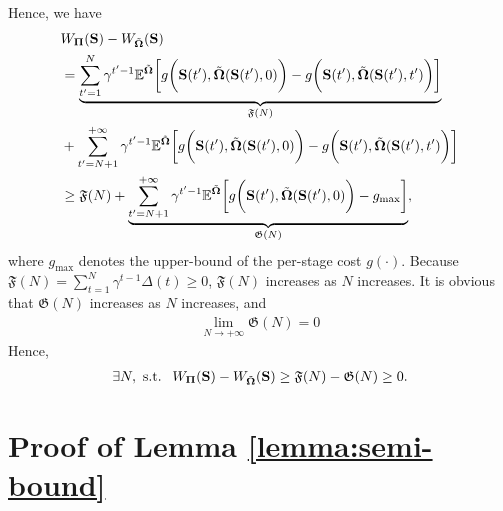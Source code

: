 Hence, we have
{\small
\begin{align*}
&W_{\boldsymbol{\Pi}}(\mathbf{S})- W_{\tilde{\boldsymbol{\Omega}}}(\mathbf{S})\\
&= 
\underbrace{\sum_{t'=1}^{N} \gamma^{t'-1} \mathbb{E}^{ \tilde{\boldsymbol{\Omega}} } \bigg[
	g\bigg(\mathbf{S}(t'), \tilde{\boldsymbol{\Omega}}(\mathbf{S}(t'),0)\bigg)
	- 	g\bigg(\mathbf{S}(t'), \tilde{\boldsymbol{\Omega}}(\mathbf{S}(t'),t')\bigg)
\bigg]}_{\mathfrak{F}(N)}\\
&+\sum_{t'=N+1}^{+\infty} \gamma^{t'-1} \mathbb{E}^{ \tilde{\boldsymbol{\Omega}} } \bigg[
	g\bigg(\mathbf{S}(t'), \tilde{\boldsymbol{\Omega}}(\mathbf{S}(t'),0)\bigg)
	- 	g\bigg(\mathbf{S}(t'), \tilde{\boldsymbol{\Omega}}(\mathbf{S}(t'),t')\bigg)
\bigg]\\
&\geq \mathfrak{F}(N) + \underbrace{\sum_{t'=N+1}^{+\infty} \gamma^{t'-1} \mathbb{E}^{ \tilde{\boldsymbol{\Omega}} } \bigg[
	g\bigg(\mathbf{S}(t'), \tilde{\boldsymbol{\Omega}}(\mathbf{S}(t'),0)\bigg)
	- 	g_{\max}
\bigg]}_{\mathfrak{G}(N)},
\end{align*}
}%
where $g_{\max}$ denotes the upper-bound of the per-stage cost $g(\cdot)$.
Because  $\mathfrak{F}(N)=\sum_{t=1}^{N}\gamma^{t-1}\Delta(t)\geq 0$, $\mathfrak{F}(N)$ increases as $N$ increases.
It is obvious that $\mathfrak{G}(N)$ increases as $N$ increases, and 
\begin{align*}
\lim\limits_{N\to+\infty}\mathfrak{G}(N)=0
\end{align*}
Hence, 
\begin{align*}
\exists N,\ \mbox{s.t. }\ W_{\boldsymbol{\Pi}}(\mathbf{S})- W_{\tilde{\boldsymbol{\Omega}}}(\mathbf{S})\geq \mathfrak{F}(N)-\mathfrak{G}(N) \geq 0.
\end{align*}

\section{ Proof of Lemma \ref{lemma:semi-bound} }
\label{append_4}

